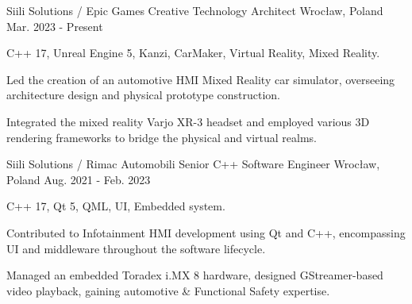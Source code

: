 

\begin{cventries}

  \cventry
    {Siili Solutions / Epic Games} %
    {Creative Technology Architect} %
    {Wrocław, Poland} %
    {Mar. 2023 - Present} %
    {
        \begin{cvitems} %
            \item {C++ 17, Unreal Engine 5, Kanzi, CarMaker, Virtual Reality, Mixed Reality.}
            \item {Led the creation of an automotive HMI Mixed Reality car simulator, overseeing architecture design and physical prototype construction.}
            \item {Integrated the mixed reality Varjo XR-3 headset and employed various 3D rendering frameworks to bridge the physical and virtual realms.}
        \end{cvitems}
    }

  \cventry
    {Siili Solutions / Rimac Automobili} %
    {Senior C++ Software Engineer} %
    {Wrocław, Poland} %
    {Aug. 2021 - Feb. 2023} %
    {
        \begin{cvitems} %
            \item {C++ 17, Qt 5, QML, UI, Embedded system.}
            \item {Contributed to Infotainment HMI development using Qt and C++, encompassing UI and middleware throughout the software lifecycle.}
            \item {Managed an embedded Toradex i.MX 8 hardware, designed GStreamer-based video playback, gaining automotive \& Functional Safety expertise.}
        \end{cvitems}
    }


\end{cventries}
